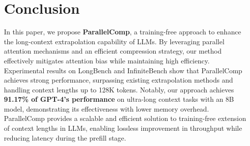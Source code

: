 \vspace{-1mm}
\section{Conclusion}
\label{conclusion}
\vspace{-1mm}
In this paper, we propose \textbf{ParallelComp}, a training-free approach to enhance the long-context extrapolation capability of LLMs. By leveraging parallel attention mechanisms and an efficient compression strategy, our method effectively mitigates attention bias while maintaining high efficiency. Experimental results on LongBench and InfiniteBench show that ParallelComp achieves strong performance, surpassing existing extrapolation methods and handling context lengths up to 128K tokens. Notably, our approach achieves \textbf{91.17\% of GPT-4's performance} on ultra-long context tasks with an 8B model, demonstrating its effectiveness with lower memory overhead. ParallelComp provides a scalable and efficient solution to training-free extension of context lengths in LLMs, enabling lossless improvement in throughput while reducing latency during the prefill stage.